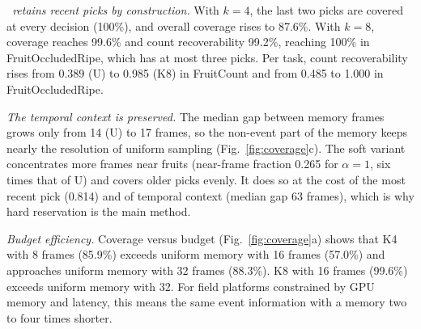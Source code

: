 \emph{\pekm\ retains recent picks by construction.} With $k=4$, the last two picks are covered at every decision (100\%), and overall coverage rises to 87.6\%. With $k=8$, coverage reaches 99.6\% and count recoverability 99.2\%, reaching 100\% in FruitOccludedRipe, which has at most three picks. Per task, count recoverability rises from 0.389 (U) to 0.985 (K8) in FruitCount and from 0.485 to 1.000 in FruitOccludedRipe.

\emph{The temporal context is preserved.} The median gap between memory frames grows only from 14 (U) to 17 frames, so the non-event part of the memory keeps nearly the resolution of uniform sampling (Fig.~\ref{fig:coverage}c). The soft variant concentrates more frames near fruits (near-frame fraction 0.265 for $\alpha=1$, six times that of U) and covers older picks evenly. It does so at the cost of the most recent pick (0.814) and of temporal context (median gap 63 frames), which is why hard reservation is the main method.

\emph{Budget efficiency.} Coverage versus budget (Fig.~\ref{fig:coverage}a) shows that K4 with 8 frames (85.9\%) exceeds uniform memory with 16 frames (57.0\%) and approaches uniform memory with 32 frames (88.3\%). K8 with 16 frames (99.6\%) exceeds uniform memory with 32. For field platforms constrained by GPU memory and latency, this means the same event information with a memory two to four times shorter.

